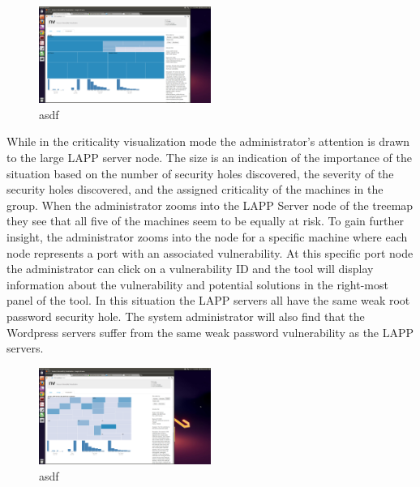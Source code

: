 \documentclass{acm_proc_article-sp}
\begin{document}
\begin{figure}
  \centering
  \includegraphics[width=0.5\textwidth]{../screenshots/final/SimGroupSingle}
  \caption{asdf}
\end{figure}

While in the criticality visualization mode the administrator's attention is
drawn to the large LAPP server node. The size is an indication of the
importance of the situation based on the number of security holes discovered,
the severity of the security holes discovered, and the assigned criticality of
the machines in the group. When the administrator zooms into the LAPP Server
node of the treemap they see that all five of the machines seem to be equally
at risk. To gain further insight, the administrator zooms into the node for a
specific machine where each node represents a port with an associated
vulnerability. At this specific port node the administrator can click on a
vulnerability ID and the tool will display information about the vulnerability
and potential solutions in the right-most panel of the tool. In this situation the LAPP servers all have the same
weak root password security hole. The system administrator will also find that
the Wordpress servers suffer from the same weak password vulnerability as the
LAPP servers.

\begin{figure}
  \centering
  \includegraphics[width=0.5\textwidth]{../screenshots/final/LAPPServerSimPort}
  \caption{asdf}
\end{figure}
\end{document}

